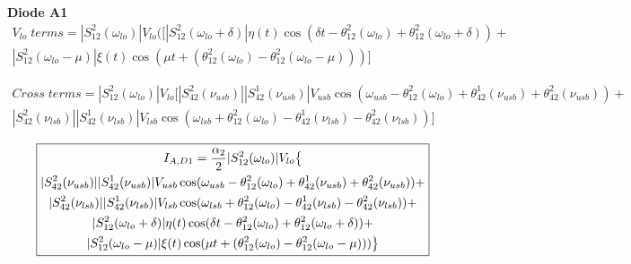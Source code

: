 \vspace{0.5cm}
\textbf{Diode A1}
\vspace{0.5cm}
\begin{equation}
\begin{gathered}
    V_{lo}\;terms = |S_{12}^2(\omega_{lo})|V_{lo}\big([ |S_{12}^2(\omega_{lo}+\delta)|\eta(t)
    \cos(\delta t-\theta_{12}^2(\omega_{lo})+\theta_{12}^2(\omega_{lo}+\delta)) + \\
    |S_{12}^2(\omega_{lo}-\mu)|\xi(t)\cos(\mu t+(\theta_{12}^2(\omega_{lo})-\theta_{12}^2(\omega_{lo}-\mu)))
    \big]
\end{gathered}
\end{equation}

\begin{equation}
    \begin{gathered}
        Cross\;terms = |S_{12}^2(\omega_{lo})|V_{lo} \big[ 
        |S_{42}^2(\nu_{usb})||S_{42}^1(\nu_{usb})|V_{usb}\cos(\omega_{usb}-\theta_{12}^2(\omega_{lo})+\theta_{42}^1(\nu_{usb})+\theta_{42}^2(\nu_{usb}))+ \\
        |S_{42}^2(\nu_{lsb})||S_{42}^1(\nu_{lsb})|V_{lsb}\cos(\omega_{lsb}+\theta_{12}^2(\omega_{lo})-\theta_{42}^1(\nu_{lsb})-\theta_{42}^2(\nu_{lsb}))
        \big]
    \end{gathered}
\end{equation}

\vspace{1cm}
\begin{equation}
\boxed{
\label{eq:i_ad1}
    \begin{gathered}
        I_{A,D1} = \frac{\alpha_{2}}{2} |S_{12}^2(\omega_{lo})|V_{lo}\big\{ \\
        |S_{42}^2(\nu_{usb})||S_{42}^1(\nu_{usb})|V_{usb}\cos(\omega_{usb}-\theta_{12}^2(\omega_{lo})+\theta_{42}^1(\nu_{usb})+\theta_{42}^2(\nu_{usb}))+ \\
        |S_{42}^2(\nu_{lsb})||S_{42}^1(\nu_{lsb})|V_{lsb}\cos(\omega_{lsb}+\theta_{12}^2(\omega_{lo})-\theta_{42}^1(\nu_{lsb})-\theta_{42}^2(\nu_{lsb})) +\\
        |S_{12}^2(\omega_{lo}+\delta)|\eta(t)\cos
        (\delta t-\theta_{12}^2(\omega_{lo})+\theta_{12}^2(\omega_{lo}+\delta)) + \\
        |S_{12}^2(\omega_{lo}-\mu)|\xi(t)\cos(\mu t+(\theta_{12}^2(\omega_{lo})-\theta_{12}^2(\omega_{lo}-\mu)))
        \big\}
    \end{gathered}
    }
\end{equation}


